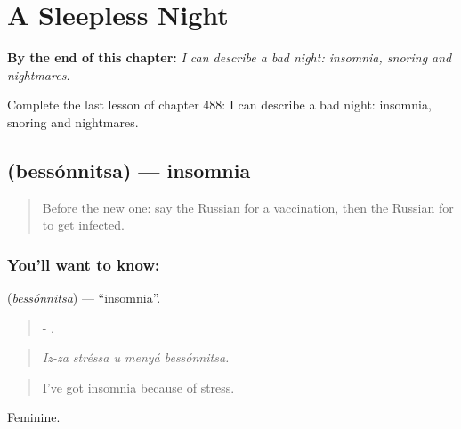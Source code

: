 
\chapter{A Sleepless Night}
\label{ch:ru-a-sleepless-night}

\begin{chapteropening}
\textbf{By the end of this chapter:} \emph{I can describe a bad night: insomnia, snoring and nightmares.}

Complete the last lesson of chapter 488: I can describe a bad night: insomnia, snoring and nightmares.
\end{chapteropening}

\section[\texorpdfstring{\ru{бессонница} (bessónnitsa)}{бессонница (bessónnitsa)}]{ (bessónnitsa) — insomnia}

\label{lesson:RU-C488-bessonnitsa}



\begin{quote}
Before the new one: say the Russian for a vaccination, then the Russian for to get infected.
\end{quote}

\subsection*{You'll want to know: }
\textbf{} (\emph{bessónnitsa}) — \textquotedblleft{}insomnia\textquotedblright{}.

\begin{quote}
-    .
\end{quote}

\begin{quote}
\emph{Iz-za stréssa u menyá bessónnitsa.}
\end{quote}

\begin{quote}
I've got insomnia because of stress.
\end{quote}

Feminine.

